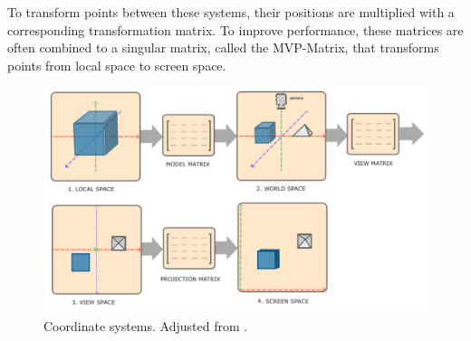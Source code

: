 To transform points between these systems, their positions are multiplied with a corresponding transformation matrix.
To improve performance, these matrices are often combined to a singular matrix, called the MVP-Matrix,
that transforms points from local space to screen space. \cite{de_vries_learn_2020}

\begin{figure}[h!]
    \centering
    \includegraphics[width=0.85\linewidth]{images/coordinateSystemsAdjusted}
    \caption{Coordinate systems. Adjusted from \cite{de_vries_learn_2020}.}
    \label{fig:coordinate-systems}
\end{figure}

